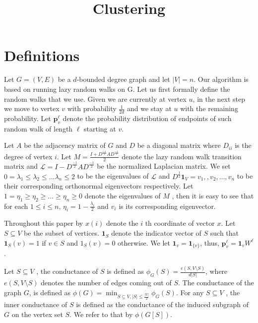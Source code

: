 \documentclass{article}
\begin{document}
\title{Clustering}
\author{}
\maketitle

\section{Definitions}
Let $G=(V,E)$ be a $d$-bounded degree graph and let $|V|=n$. Our algorithm is based on running lazy random walks on G. Let us first formally define the random walks that we use. Given we are currently at vertex $u$, in
the next step we move to vertex $v$ with probability $\frac{1}{2d}$ and we stay at $u$ with the remaining probability. Let $\mathbf{p}_v^{\ell}$ denote the probability distribution of endpoints of such random walk of length $\ell$ starting at $v$. 


Let $A$ be the adjacency matrix of $G$ and $D$ be a diagonal matrix where $D_{ii}$ is the degree of vertex $i$. Let $M = \frac{I+D^{\frac{-1}{2}}AD^{\frac{-1}{2}}}{2}$ denote the lazy random walk transition matrix and $\mathcal{L}=I - D^{\frac{-1}{2}}AD^{\frac{-1}{2}}$ be the normalized Laplacian matrix. We set $0 = \lambda_1 \leq \lambda_2 \leq \ldots \lambda_n \leq 2$ to be the eigenvalues of $\mathcal{L}$ and $D^{\frac{1}{2}}\textbf{1}_V=v_1, ,v_2, \ldots, v_n$ to be their corresponding orthonormal eigenvectors respectively. Let $1 = \eta_1 \geq  \eta_2 \geq \ldots \geq \eta_n \geq 0$ denote the eigenvalues of $M$ , then it is easy to see that for each $1\leq i \leq n$, $\eta_i = 1-\frac{\lambda_i}{2}$ and $v_i$ is its corresponding eigenvector.

Throughout this paper by $x(i)$ denote the $i$ th coordinate of vector $x$. Let
$S \subseteq V$ be the subset of vertices. $\textbf{1}_S$ denote the indicator vector of $S$ such that
$\textbf{1}_S(v) = 1$ if $v \in S$ and $1_S(v) = 0$ otherwise. We let $\textbf{1}_v = \textbf{1}_{\{v\}}$, thus, $\mathbf{p}_v^{\ell}= \mathbf{1}_vW^{\ell}$.

Let $S \subseteq V$ , the conductance of $S$ is defined as $\phi_G(S) = \frac{e(S,V \setminus S)}{d|S|}$, where $e(S, V \setminus S)$ denotes the number of edges coming out of $S$. The conductance of the graph $G$, is defined as $\phi(G)=\min_{S\subseteq V, |S|\leq\frac{|V|}{2}}\phi_G(S)$. For any $S \subseteq V$ , the inner conductance of $S$ is defined as the conductance of the induced subgraph of $G$ on the vertex set $S$. We refer to that by $\phi(G[S])$.
\end{document}
